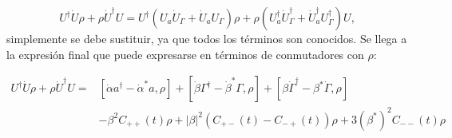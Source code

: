 \documentclass[a4paper,10pt]{report}
\begin{document}
\begin{equation}
U^\dagger \dot{U} \rho + \rho \dot{U}^\dagger U = U^\dagger(U_a \dot{U}_\Gamma+\dot{U}_a U_\Gamma)\rho + \rho(U_a^\dagger \dot{U}_\Gamma^\dagger+\dot{U}_a^\dagger U_\Gamma^\dagger)U,
\end{equation} simplemente se debe sustituir, ya que todos los términos son conocidos. Se llega a la expresión final que puede expresarse en términos de conmutadores con $\rho$:

\begin{align}
U^\dagger \dot{U} \rho + \rho \dot{U}^\dagger U =& [\dot{\alpha}a^\dagger - \dot{\alpha}^* a,\rho] +[\dot{\beta}\Gamma^\dagger - \dot{\beta}^* \Gamma,\rho]+  [\beta\dot{\Gamma}^\dagger - \beta^* \dot{\Gamma},\rho]\\
&-\nonumber\beta^2C_{++}(t)\rho + |\beta|^2(C_{+-}(t) - C_{-+}(t))\rho +3(\beta^*)^2C_{--}(t)\rho
\end{align}






\end{document}
